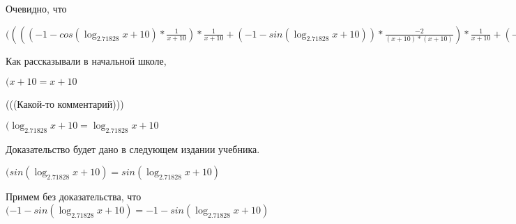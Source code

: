\documentclass[12pt,a4paper,fleqn]{article}
\theoremstyle{definition}
\begin{document}
Очевидно, что

$(((( -1  - cos(\log_{ 2.71828 }{ x  +  10 }) * \frac{ 1 }{ x  +  10 }
) * \frac{ 1 }{ x  +  10 }
 + ( -1  - sin(\log_{ 2.71828 }{ x  +  10 })) * \frac{ -2 }{( x  +  10 ) * ( x  +  10 )}
) * \frac{ 1 }{ x  +  10 }
 + ( -1  - sin(\log_{ 2.71828 }{ x  +  10 })) * \frac{ 1 }{ x  +  10 }
 * \frac{ -2 }{( x  +  10 ) * ( x  +  10 )}
 + ( -1  - sin(\log_{ 2.71828 }{ x  +  10 })) * \frac{ 1 }{ x  +  10 }
 * \frac{ -2 }{( x  +  10 ) * ( x  +  10 )}
 + cos(\log_{ 2.71828 }{ x  +  10 }) * \frac{ -1  -  -2  * ( x  +  10  +  x  +  10 )}{( x  +  10 ) * ( x  +  10 ) * ( x  +  10 ) * ( x  +  10 )}
) * { 3 }^{sin(\log_{ 2.71828 }{ x  +  10 })} + (( -1  - sin(\log_{ 2.71828 }{ x  +  10 })) * \frac{ 1 }{ x  +  10 }
 * \frac{ 1 }{ x  +  10 }
 + cos(\log_{ 2.71828 }{ x  +  10 }) * \frac{ -2 }{( x  +  10 ) * ( x  +  10 )}
) * cos(\log_{ 2.71828 }{ x  +  10 }) * \frac{ 1 }{ x  +  10 }
 * { 3 }^{sin(\log_{ 2.71828 }{ x  +  10 })} = ((( -1  - cos(\log_{ 2.71828 }{ x  +  10 }) * \frac{ 1 }{ x  +  10 }
) * \frac{ 1 }{ x  +  10 }
 + ( -1  - sin(\log_{ 2.71828 }{ x  +  10 })) * \frac{ -2 }{( x  +  10 ) * ( x  +  10 )}
) * \frac{ 1 }{ x  +  10 }
 + ( -1  - sin(\log_{ 2.71828 }{ x  +  10 })) * \frac{ 1 }{ x  +  10 }
 * \frac{ -2 }{( x  +  10 ) * ( x  +  10 )}
 + ( -1  - sin(\log_{ 2.71828 }{ x  +  10 })) * \frac{ 1 }{ x  +  10 }
 * \frac{ -2 }{( x  +  10 ) * ( x  +  10 )}
 + cos(\log_{ 2.71828 }{ x  +  10 }) * \frac{ -1  -  -2  * ( x  +  10  +  x  +  10 )}{( x  +  10 ) * ( x  +  10 ) * ( x  +  10 ) * ( x  +  10 )}
) * { 3 }^{sin(\log_{ 2.71828 }{ x  +  10 })} + (( -1  - sin(\log_{ 2.71828 }{ x  +  10 })) * \frac{ 1 }{ x  +  10 }
 * \frac{ 1 }{ x  +  10 }
 + cos(\log_{ 2.71828 }{ x  +  10 }) * \frac{ -2 }{( x  +  10 ) * ( x  +  10 )}
) * cos(\log_{ 2.71828 }{ x  +  10 }) * \frac{ 1 }{ x  +  10 }
 * { 3 }^{sin(\log_{ 2.71828 }{ x  +  10 })}$

Как рассказывали в начальной школе,

$( x  +  10  =  x  +  10 $

(((Какой-то комментарий)))

$(\log_{ 2.71828 }{ x  +  10 } = \log_{ 2.71828 }{ x  +  10 }$

Доказательство будет дано в следующем издании учебника.

$(sin(\log_{ 2.71828 }{ x  +  10 }) = sin(\log_{ 2.71828 }{ x  +  10 })$

Примем без доказательства, что
$( -1  - sin(\log_{ 2.71828 }{ x  +  10 }) =  -1  - sin(\log_{ 2.71828 }{ x  +  10 })$
\end{document}
